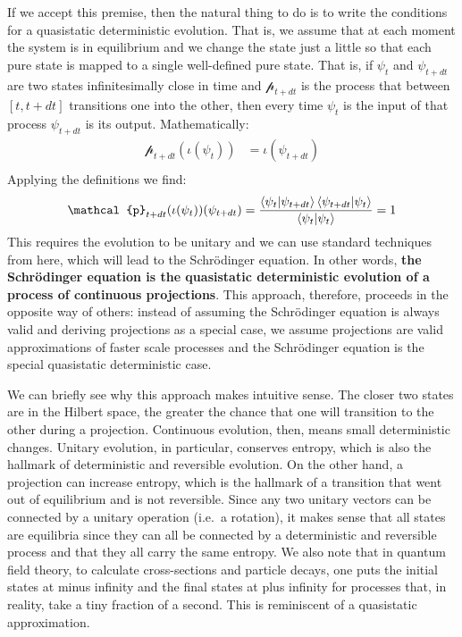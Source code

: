 \documentclass[11pt]{article}
\begin{document}
If we accept this premise, then the natural thing to do is to write the conditions for a quasistatic deterministic evolution. That is, we assume that at each moment the system is in equilibrium and we change the state just a little so that each pure state is mapped to a single well-defined pure state. That is, if $\psi_{t}$ and $\psi_{t+dt}$ are two states infinitesimally close in time and $\mathcal{p}_{t+dt}$ is the process that between $[t, t+dt]$ transitions one into the other, then every time $\psi_{t}$ is the input of that process $\psi_{t+dt}$ is its output. Mathematically:
\begin{equation}
\begin{aligned}
\mathcal{p}_{t+dt}(\iota(\psi_{t}))&=\iota(\psi_{t+dt}) \\
\end{aligned}
\end{equation}
Applying the definitions we find:
\begin{equation}
\begin{aligned}
\mathcal{p}_{t+dt}(\iota(\psi_{t}))(\psi_{t+dt}) &=
\frac{\braket{\psi_{t} | \psi_{t+dt}} \braket{\psi_{t+dt}|\psi_{t}}}{\braket{\psi_{t}|\psi_{t}}} = 1 \\
\end{aligned}
\end{equation}
This requires the evolution to be unitary and we can use standard techniques from here, which will lead to the Schr\"{o}dinger equation. In other words, \textbf{the Schr\"{o}dinger equation is the quasistatic deterministic evolution of a process of continuous projections}. This approach, therefore, proceeds in the opposite way of others: instead of assuming the Schr\"{o}dinger equation is always valid and deriving projections as a special case, we assume projections are valid approximations of faster scale processes and the Schr\"{o}dinger equation is the special quasistatic deterministic case.

We can briefly see why this approach makes intuitive sense. The closer two states are in the Hilbert space, the greater the chance that one will transition to the other during a projection. Continuous evolution, then, means small deterministic changes. Unitary evolution, in particular, conserves entropy, which is also the hallmark of deterministic and reversible evolution. On the other hand, a projection can increase entropy, which is the hallmark of a transition that went out of equilibrium and is not reversible. Since any two unitary vectors can be connected by a unitary operation (i.e.~a rotation), it makes sense that all states are equilibria since they can all be connected by a deterministic and reversible process and that they all carry the same entropy. We also note that in quantum field theory, to calculate cross-sections and particle decays, one puts the initial states at minus infinity and the final states at plus infinity for processes that, in reality, take a tiny fraction of a second. This is reminiscent of a quasistatic approximation.
\end{document}

